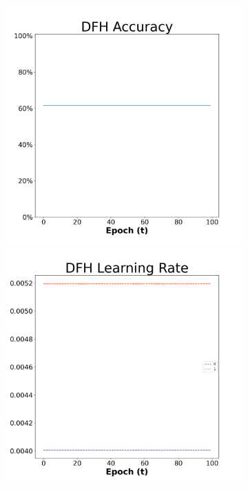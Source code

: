 \begin{figure}[H]
    \centering %
\begin{subfigure}{0.3\textwidth}
  \includegraphics[width=\linewidth]{images/exper1/SP/DFH_0.01_acc.png}
    \includegraphics[width=\linewidth]{images/exper1/SP/DFH_0.01_lr.png}

\end{subfigure}
\end{figure}

